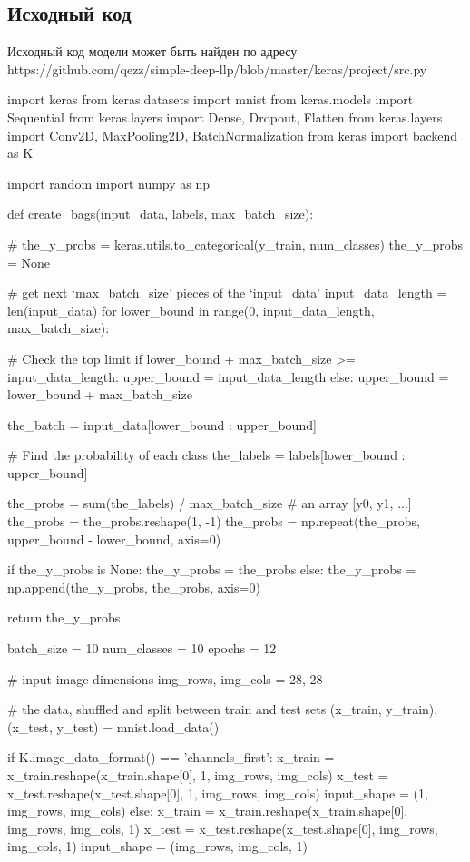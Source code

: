 \documentclass[12pt,a4paper]{article}
\begin{document}
\subsection{Исходный код}

Исходный код модели может быть найден по адресу https://github.com/qezz/simple-deep-llp/blob/master/keras/project/src.py

\begin{codeframe}
import keras
from keras.datasets import mnist
from keras.models import Sequential
from keras.layers import Dense, Dropout, Flatten
from keras.layers import Conv2D, MaxPooling2D, BatchNormalization
from keras import backend as K

import random
import numpy as np

def create_bags(input_data, labels, max_batch_size):

    # the_y_probs = keras.utils.to_categorical(y_train, num_classes)
    the_y_probs = None

    # get next `max_batch_size' pieces of the `input_data'
    input_data_length = len(input_data)
    for lower_bound in range(0, input_data_length, max_batch_size):

        # Check the top limit
        if lower_bound + max_batch_size >= input_data_length:
            upper_bound = input_data_length
        else:
            upper_bound = lower_bound + max_batch_size

        the_batch = input_data[lower_bound : upper_bound]

        # Find the probability of each class
        the_labels = labels[lower_bound : upper_bound]

        the_probs = sum(the_labels) / max_batch_size # an array [y0, y1, ...]
        the_probs = the_probs.reshape(1, -1)
        the_probs = np.repeat(the_probs, upper_bound - lower_bound, axis=0)

        if the_y_probs is None:
            the_y_probs = the_probs
        else:
            the_y_probs = np.append(the_y_probs, the_probs, axis=0)

    return the_y_probs


batch_size = 10
num_classes = 10
epochs = 12

# input image dimensions
img_rows, img_cols = 28, 28

# the data, shuffled and split between train and test sets
(x_train, y_train), (x_test, y_test) = mnist.load_data()

if K.image_data_format() == 'channels_first':
    x_train = x_train.reshape(x_train.shape[0], 1, img_rows, img_cols)
    x_test = x_test.reshape(x_test.shape[0], 1, img_rows, img_cols)
    input_shape = (1, img_rows, img_cols)
else:
    x_train = x_train.reshape(x_train.shape[0], img_rows, img_cols, 1)
    x_test = x_test.reshape(x_test.shape[0], img_rows, img_cols, 1)
    input_shape = (img_rows, img_cols, 1)



\end{codeframe}
\end{document}
